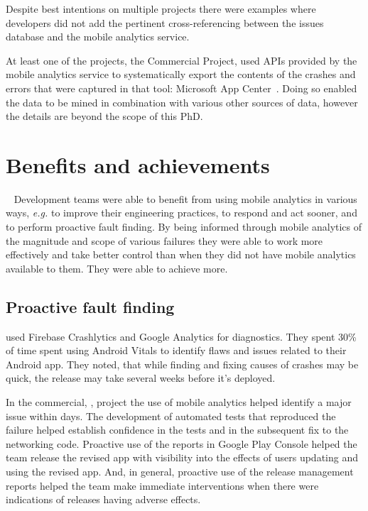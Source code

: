 Despite best intentions on multiple projects there were examples where developers did not add the pertinent cross-referencing between the issues database and the mobile analytics service. %

At least one of the projects, the Commercial Project, used APIs provided by the mobile analytics service to systematically export the contents of the crashes and errors that were captured in that tool: Microsoft App Center~. Doing so enabled the data to be mined in combination with various other sources of data, however the details are beyond the scope of this PhD.


\section{Benefits and achievements}~\label{aiu-benefits-and-achievements-section}
Development teams were able to benefit from using mobile analytics in various ways, \emph{e.g.} to improve their engineering practices, to respond and act sooner, and to perform proactive fault finding. By being informed through mobile analytics of the magnitude and scope of various failures they were able to work more effectively and take better control than when they did not have mobile analytics available to them. They were able to achieve more.

\subsection{Proactive fault finding}
 used Firebase Crashlytics and Google Analytics for diagnostics. They spent 30\% of time spent using Android Vitals to identify flaws and issues related to their Android app. %
They noted, that while finding and fixing causes of crashes may be quick, the release may take several weeks before it's deployed.

In the commercial, , project the use of mobile analytics helped identify a major issue within days. The development of automated tests that reproduced the failure helped establish confidence in the tests and in the subsequent fix to the networking code. Proactive use of the  reports in Google Play Console helped the team release the revised app with visibility into the effects of users updating and using the revised app. And, in general, proactive use of the release management reports helped the team make immediate interventions when there were indications of releases having adverse effects.

